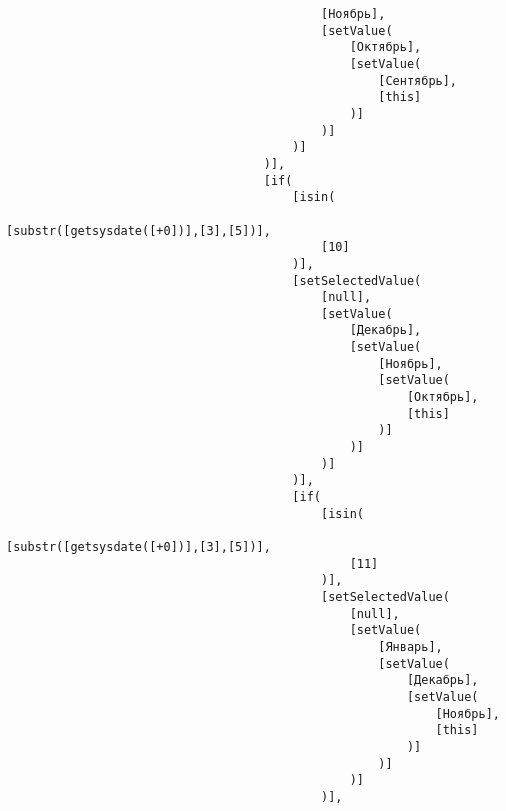 \documentclass[10pt]{book}
\begin{document}
\begin{verbatim}
                                            [Ноябрь],
                                            [setValue(
                                                [Октябрь],
                                                [setValue(
                                                    [Сентябрь],
                                                    [this]
                                                )]
                                            )]
                                        )]
                                    )],
                                    [if(
                                        [isin(
                                            [substr([getsysdate([+0])],[3],[5])],
                                            [10]
                                        )],
                                        [setSelectedValue(
                                            [null],
                                            [setValue(
                                                [Декабрь],
                                                [setValue(
                                                    [Ноябрь],
                                                    [setValue(
                                                        [Октябрь],
                                                        [this]
                                                    )]
                                                )]
                                            )]
                                        )],
                                        [if(
                                            [isin(
                                                [substr([getsysdate([+0])],[3],[5])],
                                                [11]
                                            )],
                                            [setSelectedValue(
                                                [null],
                                                [setValue(
                                                    [Январь],
                                                    [setValue(
                                                        [Декабрь],
                                                        [setValue(
                                                            [Ноябрь],
                                                            [this]
                                                        )]
                                                    )]
                                                )]
                                            )],

\end{verbatim}
\end{document}
